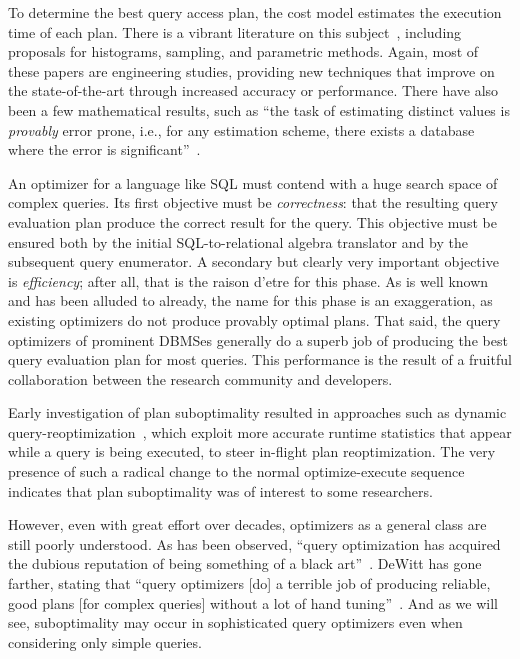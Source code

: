 \documentclass[prodmode,acmtods]{acmsmall}
\begin{document}
To determine the best query access plan, the cost model estimates the
execution time of each plan. There is a vibrant literature on this
subject~\hbox{\cite{Ioannidis03,Mannino88}}, including proposals for
histograms, sampling, and parametric methods. Again, most of these papers
are engineering studies, providing new techniques that improve on the
state-of-the-art through increased accuracy or performance. There have also
been a few mathematical results, such as ``the task of estimating distinct
values is {\em provably} error prone, i.e., for any estimation scheme, there
exists a database where the error is significant''~\cite{Chaudhuri98}.

An optimizer for a language like SQL must contend with a huge search space of
complex queries. Its first objective must be {\em correctness}: that the
resulting query evaluation plan produce the correct result for the
query. This objective must be ensured both by the initial SQL-to-relational
algebra translator and by the subsequent query enumerator. A secondary but clearly very important objective is {\em efficiency}; after
all, that is the raison d'etre for this phase. As is well known and has been
alluded to already, the name
for this phase is an exaggeration, as existing optimizers do not produce
provably optimal plans. That said, the
query optimizers of prominent \hbox{DBMSes} generally do a superb job of producing
the best query evaluation plan for most queries. This performance is the
result of a fruitful collaboration between the research community and
developers.

Early investigation of plan suboptimality resulted in approaches such as
dynamic query-reoptimization~\cite{Avnur,Bellamkonda13,kabra98,Li07}, which exploit more
accurate runtime statistics that appear while a query is being executed, to
steer in-flight plan reoptimization. The very presence of such a radical
change to the normal optimize-execute sequence indicates that plan
suboptimality was of interest to some researchers.

However, even with great effort over decades, optimizers as a general class
are still poorly understood. As has been observed, ``query optimization has
acquired the dubious reputation of being something of a black
art''~\cite{Babcock05}. DeWitt has gone farther, stating that ``query
optimizers [do] a terrible job of producing reliable, good plans [for
  complex queries] without a lot of hand
tuning''~\cite[page~59]{winslett02}. And as we will see, suboptimality may
occur in sophisticated query optimizers even when considering only simple queries.
\end{document}
